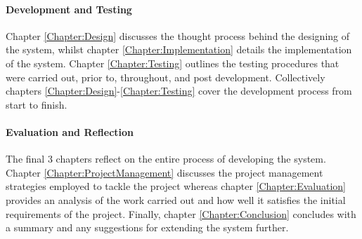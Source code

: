 \paragraph{Development and Testing}
Chapter \ref{Chapter:Design} discusses the thought process behind the designing of the system, whilst chapter \ref{Chapter:Implementation} details the implementation of the system. Chapter \ref{Chapter:Testing} outlines the testing procedures that were carried out, prior to, throughout, and post development. Collectively chapters \ref{Chapter:Design}-\ref{Chapter:Testing} cover the development process from start to finish.

\paragraph{Evaluation and Reflection}
The final 3 chapters reflect on the entire process of developing the system. Chapter \ref{Chapter:ProjectManagement} discusses the project management strategies employed to tackle the project whereas chapter \ref{Chapter:Evaluation} provides an analysis of the work carried out and how well it satisfies the initial requirements of the project. Finally, chapter \ref{Chapter:Conclusion} concludes with a summary and any suggestions for extending the system further.
